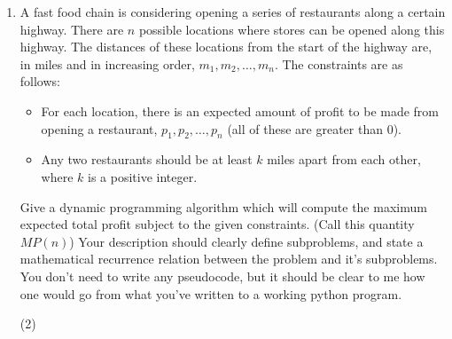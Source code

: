 \documentclass[12pt]{article}
\begin{document}
\begin{enumerate}
    \begin{figure}{h}
        \caption{Graph for problem \ref{dfs_prob}}
    \texttt{[image: dfs\_graph.png]}
    \begin{itemize}
        \item Perform a depth first search of the graph, and draw the resulting DFS forest. Start at node $A$, and proceed alphabetically whenever there is a choice of node to visit next. Label the pre and post numbers for each node. 
        \item Classify each of the non-tree edges.  
        \item Is the graph cyclic? Explain your answer in terms of part b. 
    \end{itemize}\label{dfs_prob}

    \end{figure}
    \item A fast food chain is considering opening a series of restaurants along a certain highway. There are $n$ possible locations where stores can be opened along this highway. The distances of these locations from the start of the highway are, in miles and in increasing order, $m_1, m_2, \ldots, m_n$. The constraints are as follows:
    \begin{itemize}
        \item For each location, there is an expected amount of profit to be made from opening a restaurant, $p_1, p_2, \ldots, p_n$ (all of these are greater than $0$).
        \item Any two restaurants should be at least $k$ miles apart from each other, where $k$ is a positive integer. 
    \end{itemize} 
    Give a dynamic programming algorithm which will compute the maximum expected total profit subject to the given constraints. (Call this quantity $MP(n)$) Your description should clearly define subproblems, and state a mathematical recurrence relation between the problem and it's subproblems. You don't need to write any pseudocode, but it should be clear to me how one would go from what you've written to a working python program. 

    \item[(2)] 
\end{enumerate}
\end{document}
